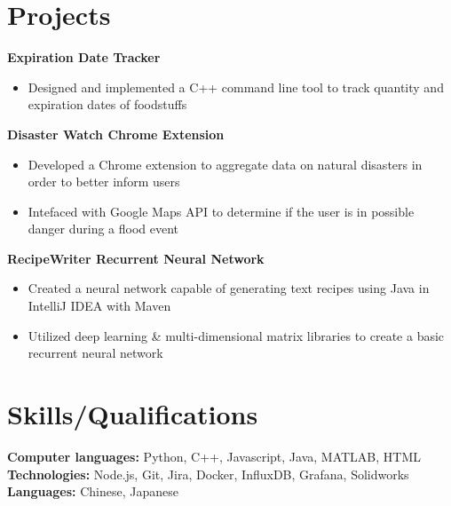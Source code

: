 \documentclass[letterpaper,11pt]{article}
\begin{document}
\section{Projects}
\textbf{Expiration Date Tracker}\\
\begin{itemize}[noitemsep, topsep=0pt, leftmargin=0.7cm]
  \item Designed and implemented a C++ command line tool to track quantity and expiration dates of foodstuffs
\end{itemize}
\textbf{Disaster Watch Chrome Extension}\\
\begin{itemize}[noitemsep, topsep=0pt, leftmargin=0.7cm]
  \item Developed a Chrome extension to aggregate data on natural disasters in order to better inform users
  \item Intefaced with Google Maps API to determine if the user is in possible danger during a flood event
\end{itemize}
\textbf{RecipeWriter Recurrent Neural Network}\\
\begin{itemize}[noitemsep, topsep=0pt, leftmargin=0.7cm]
  \item Created a neural network capable of generating text recipes using Java in IntelliJ IDEA with Maven
  \item Utilized deep learning \& multi-dimensional matrix libraries to create a basic recurrent neural network
\end{itemize}

\section{Skills/Qualifications}
\textbf{Computer languages:} Python, C++, Javascript, Java, MATLAB, HTML\\
\textbf{Technologies:} Node.js, Git, Jira, Docker, InfluxDB, Grafana, Solidworks\\
\textbf{Languages:} Chinese, Japanese\\
\end{document}
